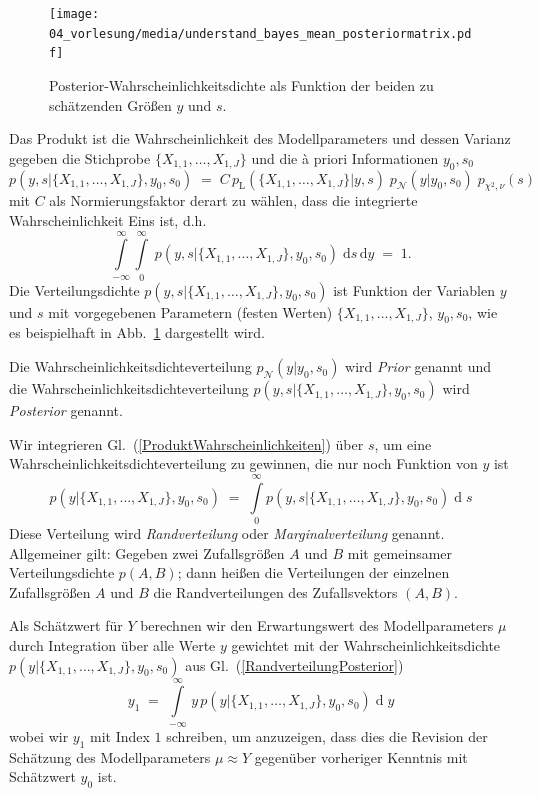 \begin{figure}
\begin{center}
\texttt{[image: 04\_vorlesung/media/understand\_bayes\_mean\_posteriormatrix.pdf]}
\caption{\label{posteriormatrix} Posterior-Wahrscheinlichkeitsdichte als Funktion
der beiden zu schätzenden Größen $y$ und $s$.}
\end{center}
\end{figure}
Das Produkt ist die Wahrscheinlichkeit des Modellparameters und dessen Varianz gegeben
die Stichprobe $\{X_{1,1}, \dots, X_{1,J}\}$ und die {\`a} priori Informationen $y_0, s_0$
\begin{equation}
p(y, s | \{X_{1,1}, \dots, X_{1,J}\}, y_0, s_0) \; = \; C \,
p_\mathrm{L}(\{X_{1,1}, \dots, X_{1,J}\} | y, s) \; p_\mathcal{N}(y | y_0, s_0) \; p_{\chi^2,\nu}(s)
\label{ProduktWahrscheinlichkeiten}
\end{equation}
mit $C$ als Normierungsfaktor derart zu wählen, dass die integrierte Wahrscheinlichkeit Eins ist, d.h.
$$
\int\limits_{-\infty}^\infty  \int\limits_0^\infty \; p(y, s | \{X_{1,1}, \dots, X_{1,J}\}, y_0, s_0) \;
\mathrm{d}s \, \mathrm{d}y \; = \; 1 .
$$
Die Verteilungsdichte $p(y, s | \{X_{1,1}, \dots, X_{1,J}\}, y_0, s_0)$ ist Funktion der
Variablen $y$ und $s$ mit vorgegebenen Parametern
(festen Werten) $\{X_{1,1}, \dots, X_{1,J}\}$, $y_0, s_0$, wie es beispielhaft in
Abb.~\ref{posteriormatrix} dargestellt wird.

Die Wahrscheinlichkeitsdichteverteilung
$p_\mathcal{N}(y | y_0, s_0)$ wird \textsl{Prior} genannt und die
Wahr\-schein\-lich\-keits\-dichte\-ver\-teilung $p(y, s | \{X_{1,1}, \dots, X_{1,J}\}, y_0, s_0)$
wird \textsl{Posterior} genannt.

Wir integrieren Gl.~(\ref{ProduktWahrscheinlichkeiten}) über $s$, um eine
Wahrscheinlichkeits\-dichte\-verteilung zu gewinnen, die nur noch Funktion von $y$ ist
\begin{equation}
p(y | \{X_{1,1}, \dots, X_{1,J}\}, y_0, s_0)  \; = \;
\int\limits_0^\infty p(y, s | \{X_{1,1}, \dots, X_{1,J}\}, y_0, s_0) \operatorname{d}s
\label{RandverteilungPosterior}
\end{equation}
Diese Verteilung wird \textsl{Randverteilung} oder \textsl{Marginalverteilung} genannt.
Allgemeiner gilt: Gegeben zwei Zufallsgrößen $A$ und $B$ mit gemeinsamer Verteilungsdichte
$p(A, B)$; dann heißen die Verteilungen der einzelnen Zufallsgrößen
$A$ und $B$ die Randverteilungen des Zufallsvektors $(A, B)$.

Als Schätzwert für $Y$ berechnen wir den Erwartungswert des Modellparameters $\mu$
durch Integration über alle Werte $y$ gewichtet mit der Wahrscheinlichkeitsdichte
$p(y | \{X_{1,1}, \dots, X_{1,J}\}, y_0, s_0)$ aus Gl.~(\ref{RandverteilungPosterior})
\begin{equation}
y_1 \; = \; \int\limits_{-\infty}^\infty \, y \, p(y | \{X_{1,1}, \dots, X_{1,J}\}, y_0, s_0)
\operatorname{d}y
\end{equation}
wobei wir $y_1$ mit Index $1$ schreiben, um anzuzeigen, dass dies die Revision der Schätzung des
Modellparameters $\mu \approx Y$ gegenüber vorheriger Kenntnis mit Schätzwert $y_0$ ist.


